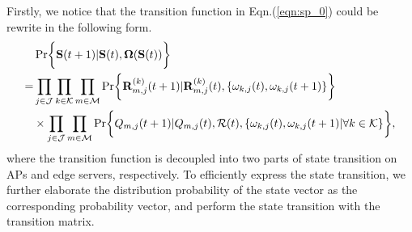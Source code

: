 Firstly, we notice that the transition function in Eqn.(\ref{eqn:sp_0}) could be rewrite in the following form.
\begin{align}
    & \Pr\Brace{ \Stat(t+1)|\Stat(t), \Policy(\Stat(t)) }
    \nonumber\\
    =& \prod_{j\in\jSpace}\prod_{k\in\apSet}\prod_{m\in\esSet}
            \Pr\Brace{
                \vec{R}^{(k)}_{m,j}(t+1) | \vec{R}^{(k)}_{m,j}(t),
                \set{\omega_{k,j}(t), \omega_{k,j}(t+1)}
            }  
        \nonumber\\
        & \times \prod_{j\in\jSpace}\prod_{m\in\esSet}
            \Pr\Brace{
                Q_{m,j}(t+1)|Q_{m,j}(t), \mathcal{R}(t),
                \set{\omega_{k,j}(t), \omega_{k,j}(t+1)|\forall k\in\apSet}
            },
\end{align}
where the transition function is decoupled into two parts of state transition on APs and edge servers, respectively.
To efficiently express the state transition, we further elaborate the distribution probability of the state vector as the corresponding probability vector, and perform the state transition with the transition matrix.


